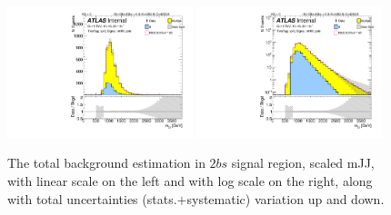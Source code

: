 \begin{figure}
\begin{center}
\includegraphics[width=0.48\textwidth,angle=-90]{figures/boosted/Signal_Syst/Moriond_bkg_9_TwoTag_split_Signal_mHH_pole_blind.pdf}
\includegraphics[width=0.48\textwidth,angle=-90]{figures/boosted/Signal_Syst/Moriond_bkg_9_TwoTag_split_Signal_mHH_pole_1_blind.pdf}
\caption{The total background estimation in $2bs$ signal region, scaled mJJ, with linear scale on the left and with log scale on the right, along with total uncertainties (stats.$+$systematic) variation up and down.}
\label{fig:FinalBkg_sys-2b-pole}
\end{center}
\end{figure}

